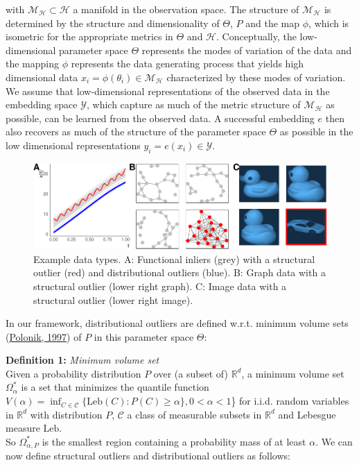 \documentclass[
  10pt]{article}
\newcommand{\hdspace}{\mathcal{H}}
\newcommand{\embedspace}{\mathcal{Y}}
\newcommand{\pspace}{\Theta}
\newcommand{\mani}{\mathcal{M}}
\begin{document}
with \(\mani_{\hdspace} \subset \hdspace\) a manifold in the observation space. The structure of \(\mani_{\hdspace}\) is determined by the structure and dimensionality of \(\pspace\), \(P\) and the map \(\phi\), which is isometric for the appropriate metrics in \(\pspace\) and \(\hdspace\).
Conceptually, the low-dimensional parameter space \(\Theta\) represents the modes of variation of the data and the mapping \(\phi\) represents the data generating process that yields high dimensional data \(x_i = \phi(\theta_i) \in \mani_{\hdspace}\) characterized by these modes of variation.
We assume that low-dimensional representations of the observed data in the embedding space \(\embedspace\), which capture as much of the metric structure of \(\mani_{\hdspace}\) as possible, can be learned from the observed data. A successful embedding \(e\) then also recovers as much of the structure of the parameter space \(\pspace\) as possible in the low dimensional representations \(y_i = e(x_i) \in \embedspace\).

\begin{figure}
\centering
\includegraphics{00_paper_wires_files/figure-latex/outtypes-1.pdf}
\caption{\label{fig:outtypes}\label{fig:outtypes}Example data types. A: Functional inliers (grey) with a structural outlier (red) and distributional outliers (blue). B: Graph data with a structural outlier (lower right graph). C: Image data with a structural outlier (lower right image).}
\end{figure}

In our framework, distributional outliers are defined w.r.t. minimum volume sets (\protect\hyperlink{ref-polonik1997minimum}{Polonik, 1997}) of \(P\) in this parameter space \(\pspace\):

\noindent \textbf{Definition 1:} \emph{Minimum volume set}\\
Given a probability distribution \(P\) over (a subset of) \(\mathbb{R}^d\), a minimum volume set \(\Omega^*_{\alpha}\) is a set that minimizes the quantile function \(V(\alpha) = \inf_{C \in \mathcal{C}}\{\text{Leb}(C): P(C) \geq \alpha\}, 0 < \alpha < 1\)\} for i.i.d. random variables in \(\mathbb{R}^{d}\) with distribution \(P\), \(\mathcal{C}\) a class of measurable subsets in \(\mathbb{R}^{d}\) and Lebesgue measure \(\text{Leb}\).\\
So \(\Omega^*_{\alpha, P}\) is the smallest region containing a probability mass of at least \(\alpha\). We can now define structural outliers and distributional outliers as follows:
\end{document}
